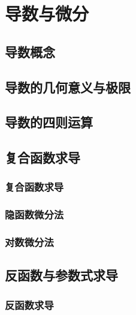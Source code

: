 

\chapter{导数与微分}\label{ch:4}
\section{导数概念}
\begin{exercise}

\end{exercise}
\section{导数的几何意义与极限}
\begin{exercise}

\end{exercise}
\section{导数的四则运算}
\begin{exercise}

\end{exercise}
\section{复合函数求导}
\subsection{复合函数求导}
\subsection{隐函数微分法}
\subsection{对数微分法}
\begin{exercise}

\end{exercise}
\section{反函数与参数式求导}
\subsection{反函数求导}
